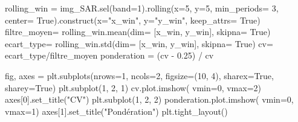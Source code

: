 \documentclass[
  french,
  11pt,
  letterpaper,
  open=any,
  twoside=false,
  french]{scrbook}
\newenvironment{Shaded}{\begin{snugshade}}{\end{snugshade}}
\newcommand{\DecValTok}[1]{\textcolor[rgb]{0.68,0.00,0.00}{#1}}
\newcommand{\FloatTok}[1]{\textcolor[rgb]{0.68,0.00,0.00}{#1}}
\newcommand{\NormalTok}[1]{\textcolor[rgb]{0.00,0.23,0.31}{#1}}
\newcommand{\OperatorTok}[1]{\textcolor[rgb]{0.37,0.37,0.37}{#1}}
\newcommand{\StringTok}[1]{\textcolor[rgb]{0.13,0.47,0.30}{#1}}
\newcommand{\VariableTok}[1]{\textcolor[rgb]{0.07,0.07,0.07}{#1}}
\begin{document}
\begin{Shaded}
\begin{Highlighting}[]
\NormalTok{rolling\_win }\OperatorTok{=}\NormalTok{ img\_SAR.sel(band}\OperatorTok{=}\DecValTok{1}\NormalTok{).rolling(x}\OperatorTok{=}\DecValTok{5}\NormalTok{, y}\OperatorTok{=}\DecValTok{5}\NormalTok{,  min\_periods}\OperatorTok{=} \DecValTok{3}\NormalTok{, center}\OperatorTok{=} \VariableTok{True}\NormalTok{).construct(x}\OperatorTok{=}\StringTok{"x\_win"}\NormalTok{, y}\OperatorTok{=}\StringTok{"y\_win"}\NormalTok{, keep\_attrs}\OperatorTok{=} \VariableTok{True}\NormalTok{)}
\NormalTok{filtre\_moyen}\OperatorTok{=}\NormalTok{ rolling\_win.mean(dim}\OperatorTok{=}\NormalTok{ [}\StringTok{\textquotesingle{}x\_win\textquotesingle{}}\NormalTok{, }\StringTok{\textquotesingle{}y\_win\textquotesingle{}}\NormalTok{], skipna}\OperatorTok{=} \VariableTok{True}\NormalTok{)}
\NormalTok{ecart\_type}\OperatorTok{=}\NormalTok{ rolling\_win.std(dim}\OperatorTok{=}\NormalTok{ [}\StringTok{\textquotesingle{}x\_win\textquotesingle{}}\NormalTok{, }\StringTok{\textquotesingle{}y\_win\textquotesingle{}}\NormalTok{], skipna}\OperatorTok{=} \VariableTok{True}\NormalTok{)}
\NormalTok{cv}\OperatorTok{=}\NormalTok{ ecart\_type}\OperatorTok{/}\NormalTok{filtre\_moyen}
\NormalTok{ponderation }\OperatorTok{=}\NormalTok{ (cv }\OperatorTok{{-}} \FloatTok{0.25}\NormalTok{) }\OperatorTok{/}\NormalTok{ cv}

\NormalTok{fig, axes }\OperatorTok{=}\NormalTok{ plt.subplots(nrows}\OperatorTok{=}\DecValTok{1}\NormalTok{, ncols}\OperatorTok{=}\DecValTok{2}\NormalTok{, figsize}\OperatorTok{=}\NormalTok{(}\DecValTok{10}\NormalTok{, }\DecValTok{4}\NormalTok{), sharex}\OperatorTok{=}\VariableTok{True}\NormalTok{, sharey}\OperatorTok{=}\VariableTok{True}\NormalTok{)}
\NormalTok{plt.subplot(}\DecValTok{1}\NormalTok{, }\DecValTok{2}\NormalTok{, }\DecValTok{1}\NormalTok{)}
\NormalTok{cv.plot.imshow( vmin}\OperatorTok{=}\DecValTok{0}\NormalTok{, vmax}\OperatorTok{=}\DecValTok{2}\NormalTok{)}
\NormalTok{axes[}\DecValTok{0}\NormalTok{].set\_title(}\StringTok{"CV"}\NormalTok{)}
\NormalTok{plt.subplot(}\DecValTok{1}\NormalTok{, }\DecValTok{2}\NormalTok{, }\DecValTok{2}\NormalTok{)}
\NormalTok{ponderation.plot.imshow( vmin}\OperatorTok{=}\DecValTok{0}\NormalTok{, vmax}\OperatorTok{=}\DecValTok{1}\NormalTok{) }
\NormalTok{axes[}\DecValTok{1}\NormalTok{].set\_title(}\StringTok{"Pondération"}\NormalTok{)}
\NormalTok{plt.tight\_layout()}
\end{Highlighting}
\end{Shaded}
\end{document}
